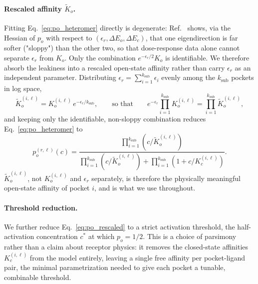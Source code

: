 \documentclass[aps,pre,superscriptaddress,floatfix,longbibliography]{revtex4-2}
\begin{document}
\paragraph{Rescaled affinity $\tilde K_o$.} Fitting Eq.~\eqref{eq:po_heteromer}
directly is degenerate: Ref.~\cite{einav_monod-wyman-changeux_2017} shows, via
the Hessian of $p_o$ with respect to $(\epsilon_r,\Delta E_o,\Delta E_c)$,
that one eigendirection is far softer ("sloppy") than the other two, so that
dose-response data alone cannot separate $\epsilon_r$ from $K_o$. Only the
combination $e^{-\epsilon_r/2}K_o$ is identifiable. We therefore absorb the
leakiness into a rescaled open-state affinity rather than carry $\epsilon_r$
as an independent parameter. Distributing $\epsilon_r=\sum_{i=1}^{k_\text{sub}}\epsilon_i$
evenly among the $k_\text{sub}$ pockets in log space,
\begin{equation}
\tilde K_o^{(i,\ell)} = K_o^{(i,\ell)}\, e^{-\epsilon_r/k_\text{sub}},
\qquad\text{so that}\qquad
e^{-\epsilon_r}\prod_{i=1}^{k_\text{sub}} K_o^{(i,\ell)} = \prod_{i=1}^{k_\text{sub}} \tilde K_o^{(i,\ell)},
\end{equation}
and keeping only the identifiable, non-sloppy combination reduces
Eq.~\eqref{eq:po_heteromer} to
\begin{equation}
p_o^{(r,\ell)}(c) = \frac{\prod_{i=1}^{k_\text{sub}} (c/\tilde K_o^{(i,\ell)})}{\prod_{i=1}^{k_\text{sub}}(c/\tilde K_o^{(i,\ell)}) + \prod_{i=1}^{k_\text{sub}}(1+c/K_c^{(i,\ell)})}.
\label{eq:po_rescaled}
\end{equation}
$\tilde K_o^{(i,\ell)}$, not $K_o^{(i,\ell)}$ and $\epsilon_r$ separately, is
therefore the physically meaningful open-state affinity of pocket $i$, and is
what we use throughout.

\paragraph{Threshold reduction.} We further reduce
Eq.~\eqref{eq:po_rescaled} to a strict activation threshold, the
half-activation concentration $c^*$ at which $p_o=1/2$. This is a choice
of parsimony rather than a claim about receptor physics: it removes the
closed-state affinities $K_c^{(i,\ell)}$ from the model entirely, leaving a
single free affinity per pocket-ligand pair, the minimal parametrization
needed to give each pocket a tunable, combinable threshold.
\end{document}
